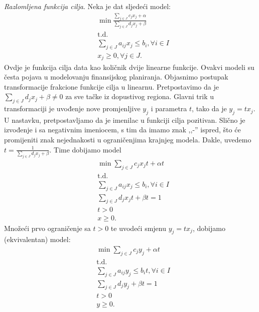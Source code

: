 \documentclass[b5paper, utf8, 11pt, colorlinks]{book}
\theoremstyle{definition}
\begin{document}
\emph{Razlomljena funkcija cilja}. Neka je dat sljedeći model:
 \begin{align*}
 	& \min \frac{\sum_{j \in J} c_j x_j + \alpha}{ \sum_{j \in J} d_j x_j + \beta} \\
 		& \mbox{t.d.} \nonumber \\
 	& \sum_{j \in J} a_{ij} x_j \leq b_i,  \forall i \in I \\
 	& x_j \geq 0, \forall j \in J.
 \end{align*}
Ovdje je funkcija cilja data kao količnik dvije linearne funkcije. Ovakvi modeli su česta pojava u modelovanju finansijskog planiranja. Objasnimo postupak transformacije frakcione funkcije cilja u linearnu. Pretpostavimo da je $\sum_{j \in J}d_j x_j + \beta \neq 0$ za sve tačke iz dopustivog regiona. Glavni trik u transformaciji je uvođenje nove promjenljive $y_j$ i parametra $t$, tako da je $y_j = t x_j$. U nastavku, pretpostavljamo da je imenilac u funkciji cilja pozitivan. Slično je izvođenje i sa negativnim imeniocem, s tim da imamo znak ,,-'' ispred, što će promijeniti znak nejednakosti u ograničenjima krajnjeg modela. Dakle, uvedemo $t = \frac{1}{\sum_{j \in J} d_j x_j + \beta }$. Time dobijamo model
\begin{align*}
	&\min \sum_{j \in J} c_j x_j t + \alpha t \\
	& \mbox{t.d.} \nonumber \\
	&\sum_{j \in J} a_{ij} x_j \leq b_i,  \forall i \in I \\
	& \sum_{j \in J} d_j x_j t + \beta t = 1 \\
	& t > 0 \\
	& x \geq 0.
\end{align*}
Množeći prvo ograničenje sa $t>0$ te uvodeći smjenu $y_j = t x_j$, dobijamo (ekvivalentan)  model:
 \begin{align*}
 	&\min \sum_{j \in J} c_j y_j + \alpha t \\
	 	& \mbox{t.d.} \nonumber \\
 	& \sum_{j \in J} a_{ij} y_j \leq b_i t,  \forall i \in I \\
	 & \sum_{j \in J} d_j y_j + \beta t = 1 \\
	 & t > 0 \\
	& y \geq 0.
\end{align*}
\end{document}
